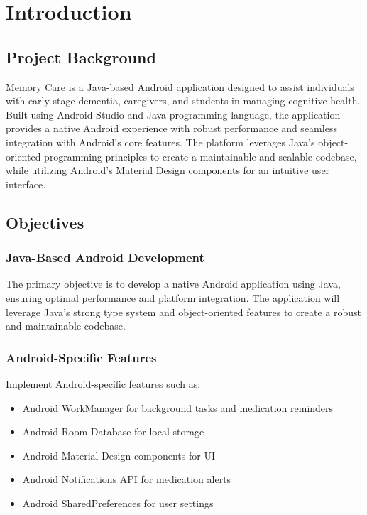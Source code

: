 
\chapter{Introduction}

\section{Project Background}
Memory Care is a Java-based Android application designed to assist individuals with early-stage dementia, caregivers, and students in managing cognitive health. Built using Android Studio and Java programming language, the application provides a native Android experience with robust performance and seamless integration with Android's core features. The platform leverages Java's object-oriented programming principles to create a maintainable and scalable codebase, while utilizing Android's Material Design components for an intuitive user interface.

\section{Objectives}
\subsection{Java-Based Android Development}
The primary objective is to develop a native Android application using Java, ensuring optimal performance and platform integration. The application will leverage Java's strong type system and object-oriented features to create a robust and maintainable codebase.

\subsection{Android-Specific Features}
Implement Android-specific features such as:
\begin{itemize}
    \item Android WorkManager for background tasks and medication reminders
    \item Android Room Database for local storage
    \item Android Material Design components for UI
    \item Android Notifications API for medication alerts
    \item Android SharedPreferences for user settings
\end{itemize}

